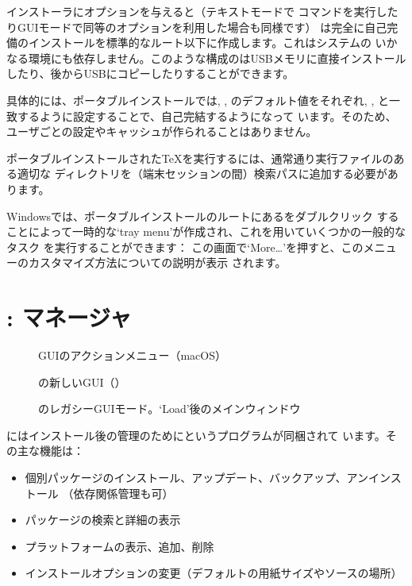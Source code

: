 \documentclass[uplatex,dvipdfmx,12pt,tombow]{jsarticle}
\begin{document}
\TL インストーラにオプションを与えると（テキストモードで%
コマンドを実行したりGUIモードで同等のオプションを利用した場合も同様です）\TL
は完全に自己完備のインストールを標準的なルート以下に作成します。これはシステムの
いかなる環境にも依存しません。このような構成の\TL はUSBメモリに直接インストール
したり、後からUSBにコピーしたりすることができます。

具体的には、ポータブルインストールでは, , のデフォルト値をそれぞれ, ,
と一致するように設定することで、自己完結するようになって
います。そのため、ユーザごとの設定やキャッシュが作られることはありません。

ポータブルインストールされた\TeX を実行するには、通常通り実行ファイルのある適切な
ディレクトリを（端末セッションの間）検索パスに追加する必要があります。

Windowsでは、ポータブルインストールのルートにあるをダブルクリック
することによって一時的な`tray menu'が作成され、これを用いていくつかの一般的なタスク
を実行することができます：
%
\medskip
{}
\smallskip
%
この画面で`More\ldots'を押すと、このメニューのカスタマイズ方法についての説明が表示
されます。

\section{: \TL マネージャ}
\label{sec:tlmgr}

\begin{figure}[tb]
\caption{ GUIのアクションメニュー（macOS）}
\label{fig:tlshell}
\end{figure}

\begin{figure}[tb]
\caption{の新しい{GUI}（）}
\label{fig:tlcockpit}
\end{figure}

\begin{figure}[tb]
\caption{のレガシーGUIモード。`Load'後のメインウィンドウ}
\label{fig:tlmgr-gui}
\end{figure}

\TL にはインストール後の\TL 管理のためにというプログラムが同梱されて
います。その主な機能は：
%
\begin{itemize}
\item 個別パッケージのインストール、アップデート、バックアップ、アンインストール
  （依存関係管理も可）
\item パッケージの検索と詳細の表示
\item プラットフォームの表示、追加、削除
\item インストールオプションの変更（デフォルトの用紙サイズやソースの場所）
\end{itemize}
\end{document}
